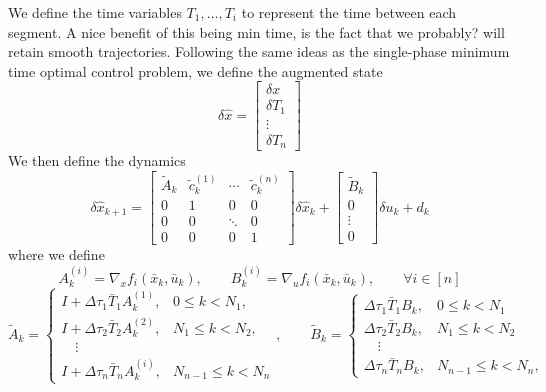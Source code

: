 \documentclass{article}
\begin{document}
We define the time variables $T_1, \ldots, T_i$ to represent the time between each segment. A nice benefit of this being min time, is the fact that we probably? will retain smooth trajectories. Following the same ideas as the single-phase minimum time optimal control problem, we define the augmented state
\begin{equation}
    \delta \hat x = \begin{bmatrix}
        \delta x \\
        \delta T_1 \\
        \vdots \\
        \delta T_n
    \end{bmatrix}
\end{equation}
We then define the dynamics
\begin{equation}
    \delta \hat x_{k+1} = \begin{bmatrix}
        \tilde{A}_k & \tilde c_k^{(1)} & \cdots & \tilde c_k^{(n)} \\
        0 & 1 & 0 & 0\\
        0 & 0 & \ddots & 0 \\
        0 & 0 & 0 & 1
    \end{bmatrix} \delta \hat x_k
    +
    \begin{bmatrix}
        \tilde B_k \\
        0 \\
        \vdots \\
        0
    \end{bmatrix} \delta u_k
    + d_k
\end{equation}
where we define
\begin{equation}
    A_{k}^{(i)} = \nabla_x f_i(\bar x_k, \bar u_k), \qquad B_{k}^{(i)} = \nabla_u f_i(\bar x_k, \bar u_k), \qquad \forall i \in [n]
\end{equation}
\begin{equation}
    \tilde A_k = \begin{cases}
        I + \Delta \tau_1 \bar{T}_1 A_k^{(1)}, & 0 \leq k < N_1, \\
        I + \Delta \tau_2 \bar{T}_2 A_k^{(2)}, & N_1 \leq k < N_2, \\
        \quad \vdots \\
        I + \Delta \tau_n \bar{T}_n A_k^{(i)}, & N_{n-1} \leq k < N_n
    \end{cases},
    \qquad
    \tilde B_k = \begin{cases}
        \Delta \tau_1 \bar{T}_1 B_k, & 0 \leq k < N_1 \\
        \Delta \tau_2 \bar{T}_2 B_k, & N_1 \leq k < N_2 \\
        \quad \vdots \\
        \Delta \tau_n \bar{T}_n B_k, & N_{n-1} \leq k < N_n,
    \end{cases}
\end{equation}
\end{document}
